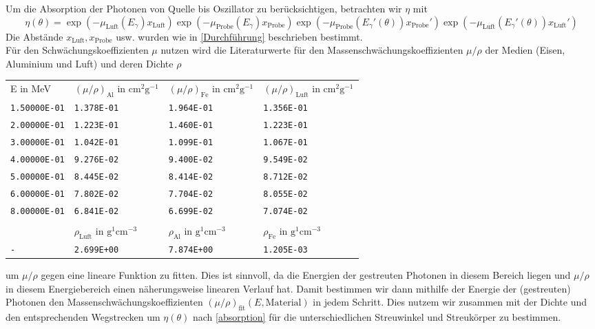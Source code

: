 Um die Absorption der Photonen von Quelle bis Oszillator zu berücksichtigen, betrachten wir $\eta$ mit
\begin{equation}\label{absorption}
    \eta(\theta) = \exp{(-\mu_{\text{Luft}}(E_\gamma)x_{\text{Luft}})}\exp{(-\mu_{\text{Probe}}(E_\gamma)x_{\text{Probe}})}\exp{(-\mu_{\text{Probe}}(E_\gamma'(\theta))x_{\text{Probe}}')}\exp{(-\mu_{\text{Luft}}(E_\gamma'(\theta))x_{\text{Luft}}')}
\end{equation}
Die Abstände $x_{\text{Luft}}, x_{\text{Probe}}$ usw. wurden wie in \ref{Durchführung} beschrieben bestimmt.\\
Für den Schwächungskoeffizienten $\mu$ nutzen wird die Literaturwerte \cite{data_nist} für den Massenschwächungskoeffizienten $\mu/\rho$ der Medien (Eisen, Aluminium und Luft) und deren Dichte $\rho$
\begin{center}
    \begin{tabular}{llll}
        E in MeV & $(\mu/\rho)_\text{Al}$ in $\unit{\centi\meter^2\gram^{-1}}$ & $(\mu/\rho)_\text{Fe}$ in $\unit{\centi\meter^2\gram^{-1}}$ & $(\mu/\rho)_\text{Luft}$ in $\unit{\centi\meter^2\gram^{-1}}$ \\
        \texttt{1.50000E-01} & \texttt{1.378E-01} & \texttt{1.964E-01} & \texttt{1.356E-01} \\
        \texttt{2.00000E-01} & \texttt{1.223E-01} & \texttt{1.460E-01} & \texttt{1.223E-01} \\
        \texttt{3.00000E-01} & \texttt{1.042E-01} & \texttt{1.099E-01} & \texttt{1.067E-01} \\
        \texttt{4.00000E-01} & \texttt{9.276E-02} & \texttt{9.400E-02} & \texttt{9.549E-02} \\
        \texttt{5.00000E-01} & \texttt{8.445E-02} & \texttt{8.414E-02} & \texttt{8.712E-02} \\
        \texttt{6.00000E-01} & \texttt{7.802E-02} & \texttt{7.704E-02} & \texttt{8.055E-02} \\
        \texttt{8.00000E-01} & \texttt{6.841E-02} & \texttt{6.699E-02} & \texttt{7.074E-02} \\
        &&&\\
        & $\rho_\text{Luft}$ in $\unit{\gram^1\centi\meter^{-3}}$ & $\rho_\text{Al}$ in $\unit{\gram^1\centi\meter^{-3}}$ & $\rho_\text{Fe}$ in $\unit{\gram^1\centi\meter^{-3}}$ \\
        \texttt{-} & \texttt{2.699E+00} & \texttt{7.874E+00} & \texttt{1.205E-03} \\
    \end{tabular}
\end{center}
um $\mu/\rho$ gegen eine lineare Funktion zu fitten. Dies ist sinnvoll, da die Energien der gestreuten Photonen in diesem Bereich liegen und $\mu/\rho$ in diesem Energiebereich einen näherungsweise linearen Verlauf hat. Damit bestimmen wir dann mithilfe der Energie der (gestreuten) Photonen den Massenschwächungskoeffizienten $(\mu/\rho)_\text{fit}(E, \text{Material})$ in jedem Schritt. Dies nutzem wir zusammen mit der Dichte und den entsprechenden Wegstrecken um $\eta(\theta)$ nach \ref{absorption} für die unterschiedlichen Streuwinkel und Streukörper zu bestimmen.
